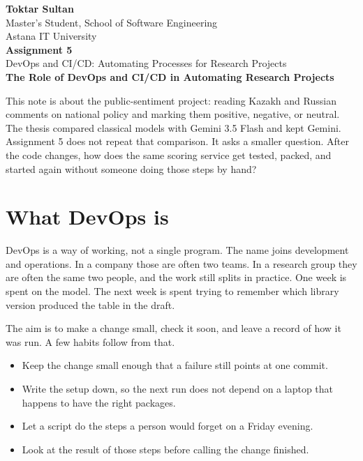 \documentclass[12pt,a4paper]{article}
\begin{document}
\begin{center}
\textbf{Toktar Sultan}\\
Master's Student, School of Software Engineering\\
Astana IT University\\[1em]
\textbf{Assignment 5}\\
DevOps and CI/CD: Automating Processes for Research Projects\\[0.8em]
\textbf{The Role of DevOps and CI/CD in Automating Research Projects}
\end{center}

\vspace{0.6em}

\noindent
This note is about the public-sentiment project: reading Kazakh and Russian comments on national policy and marking them positive, negative, or neutral. The thesis compared classical models with Gemini 3.5 Flash and kept Gemini. Assignment 5 does not repeat that comparison. It asks a smaller question. After the code changes, how does the same scoring service get tested, packed, and started again without someone doing those steps by hand?

\section{What DevOps is}

DevOps is a way of working, not a single program. The name joins development and operations. In a company those are often two teams. In a research group they are often the same two people, and the work still splits in practice. One week is spent on the model. The next week is spent trying to remember which library version produced the table in the draft.

The aim is to make a change small, check it soon, and leave a record of how it was run. A few habits follow from that.

\begin{itemize}
    \item Keep the change small enough that a failure still points at one commit.
    \item Write the setup down, so the next run does not depend on a laptop that happens to have the right packages.
    \item Let a script do the steps a person would forget on a Friday evening.
    \item Look at the result of those steps before calling the change finished.
\end{itemize}
\end{document}
